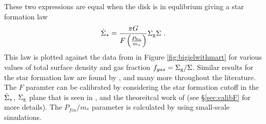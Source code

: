 These two expressions are equal when the disk is in equlibrium giving a star formation law
\begin{equation}
\label{eqn:martsfr}
\dot{\Sigma}_* = \frac{\pi G}{F \left(\frac{P_\mathrm{fin}}{m_*}\right)} \Sigma_\mathrm{g} \Sigma~.
\end{equation}
This law is plotted against the data from \citet{bigiel_star_2008} in Figure \ref{fig:bigielwithmart} for various values of total surface density and gas fraction $f_{gas} = \Sigma_\mathrm{g}/\Sigma$.
Similar results for the star formation law are found by \citet{ostriker_maximally_2011, faucher-giguere_feedback-regulated_2013, martizzi_supernova_2016}, and many more throughout the literature.
The $F$ paramter can be calibrated by considering the star formation cutoff in the $\dot{\Sigma}_*$, $\Sigma_\mathrm{g}$ plane that is seen in \citet{bigiel_star_2008}, and the theoreitcal work of \citet{schaye_star_2004} (see \S \ref{sec:calibF} for more details).
The $P_{fin}/m_*$ parameter is calculated by using small-scale simulations.

